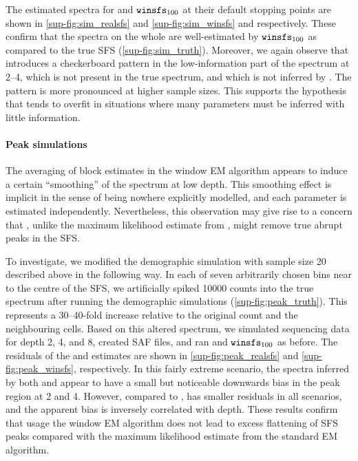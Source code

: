 The estimated spectra for \realsfs and $\winsfs[100]$ at their default stopping points are shown in \cref{sup-fig:sim_realsfs} and \cref{sup-fig:sim_winsfs} and respectively.
These confirm that the spectra on the whole are well-estimated by $\winsfs[100]$ as compared to the true SFS (\cref{sup-fig:sim_truth}).
Moreover, we again observe that \realsfs introduces a checkerboard pattern in the low-information part of the spectrum at \SIrange{2}{4}{\depth}, which is not present in the true spectrum, and which is not inferred by \winsfs.
The pattern is more pronounced at higher sample sizes.
This supports the hypothesis that \realsfs tends to overfit in situations where many parameters must be inferred with little information.

\paragraph{Peak simulations}

The averaging of block estimates in the window EM algorithm appears to induce a certain \enquote{smoothing} of the spectrum at low depth.
This smoothing effect is implicit in the sense of being nowhere explicitly modelled, and each parameter is estimated independently.
Nevertheless, this observation may give rise to a concern that \winsfs, unlike the maximum likelihood estimate from \realsfs, might remove true abrupt peaks in the SFS.

To investigate, we modified the demographic simulation with sample size \num{20} described above in the following way.
In each of seven arbitrarily chosen bins near to the centre of the SFS, we artificially spiked \num{10000} counts into the true spectrum after running the demographic simulations (\cref{sup-fig:peak_truth}).
This represents a \numrange{30}{40}-fold increase relative to the original count and the neighbouring cells.
Based on this altered spectrum, we simulated sequencing data for depth \SI{2}{\depth}, \SI{4}{\depth}, and \SI{8}{\depth}, created SAF files, and ran \realsfs and $\winsfs[100]$ as before.
The residuals of the \realsfs and \winsfs estimates are shown in \cref{sup-fig:peak_realsfs} and \cref{sup-fig:peak_winsfs}, respectively.
In this fairly extreme scenario, the spectra inferred by both \winsfs and \realsfs appear to have a small but noticeable downwards bias in the peak region at \SI{2}{\depth} and \SI{4}{\depth}.
However, compared to \realsfs, \winsfs has smaller residuals in all scenarios, and the apparent bias is inversely correlated with depth.
These results confirm that usage the window EM algorithm does not lead to excess flattening of SFS peaks compared with the maximum likelihood estimate from the standard EM algorithm.

